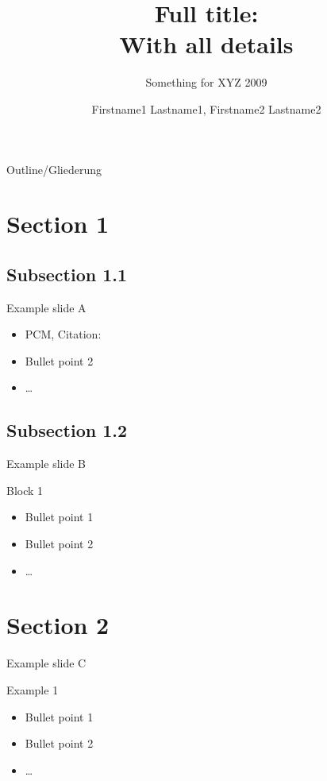 \documentclass[18pt]{beamer}
\title[Short title]{Full title:\\ With all details}
\subtitle{Something for XYZ 2009}
\author{Firstname1 Lastname1, Firstname2 Lastname2}
\institute{Institute of Information Systems and Marketing (IISM)}
\begin{document}

\begin{frame}
\titlepage
\end{frame}

\begin{frame}{Outline/Gliederung}
  \hfill
\parbox{.73\textwidth}{
    \tableofcontents
  }
\end{frame}

\section{Section 1}
\subsection{Subsection 1.1}
\begin{frame}{Example slide A}
\begin{itemize}
\item PCM, Citation: \cite{becker2008a} %
\pause
\item Bullet point 2
\item \dots
\end{itemize}
\end{frame}

\subsection{Subsection 1.2}
\begin{frame}{Example slide B}
\begin{block}{Block 1}
\begin{itemize}
\item Bullet point 1
\pause
\item Bullet point 2
\item \dots
\end{itemize}
\end{block}
\end{frame}

\section{Section 2}
\begin{frame}{Example slide C}
\begin{exampleblock}{Example 1}
\begin{itemize}
\item Bullet point 1
\pause
\item Bullet point 2
\item \dots
\end{itemize}
\end{exampleblock}
\end{frame}
\end{document}
